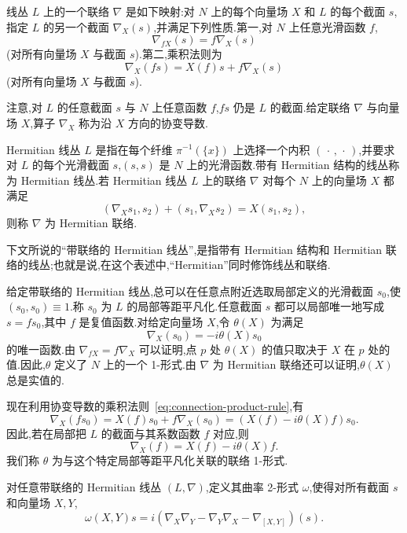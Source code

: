 \begin{definition}[线丛上的联络]
\label{def:connection-line-bundle}
线丛 $L$ 上的一个联络 $\nabla$ 是如下映射:对 $N$ 上的每个向量场 $X$ 和 $L$ 的每个截面 $s$,指定 $L$ 的另一个截面 $\nabla_X(s)$,并满足下列性质.第一,对 $N$ 上任意光滑函数 $f$,
\[
 \nabla_{fX}(s)=f\nabla_X(s)
 \label{eq:connection-linearity-vector-field}
\]
(对所有向量场 $X$ 与截面 $s$).第二,乘积法则为
\[
 \nabla_X(fs)=X(f)s+f\nabla_X(s)
 \label{eq:connection-product-rule}
\]
(对所有向量场 $X$ 与截面 $s$).

注意,对 $L$ 的任意截面 $s$ 与 $N$ 上任意函数 $f$,$fs$ 仍是 $L$ 的截面.给定联络 $\nabla$ 与向量场 $X$,算子 $\nabla_X$ 称为沿 $X$ 方向的协变导数.
\end{definition}

\begin{definition}[Hermitian 线丛]
\label{def:hermitian-line-bundle}
Hermitian 线丛 $L$ 是指在每个纤维 $\pi^{-1}(\{x\})$ 上选择一个内积 $(\,\cdot\,,\,\cdot\,)$,并要求对 $L$ 的每个光滑截面 $s$,$(s,s)$ 是 $N$ 上的光滑函数.带有 Hermitian 结构的线丛称为 Hermitian 线丛.若 Hermitian 线丛 $L$ 上的联络 $\nabla$ 对每个 $N$ 上的向量场 $X$ 都满足
\[
 (\nabla_Xs_1,s_2)+(s_1,\nabla_Xs_2)=X(s_1,s_2),
 \label{eq:hermitian-connection}
\]
则称 $\nabla$ 为 Hermitian 联络.
\end{definition}

下文所说的“带联络的 Hermitian 线丛”,是指带有 Hermitian 结构和 Hermitian 联络的线丛;也就是说,在这个表述中,“Hermitian”同时修饰线丛和联络.

给定带联络的 Hermitian 线丛,总可以在任意点附近选取局部定义的光滑截面 $s_0$,使 $(s_0,s_0)\equiv1$.称 $s_0$ 为 $L$ 的局部等距平凡化.任意截面 $s$ 都可以局部唯一地写成 $s=fs_0$,其中 $f$ 是复值函数.对给定向量场 $X$,令 $\theta(X)$ 为满足
\[
 \nabla_X(s_0)=-i\theta(X)s_0
\]
的唯一函数.由 $\nabla_{fX}=f\nabla_X$ 可以证明,点 $p$ 处 $\theta(X)$ 的值只取决于 $X$ 在 $p$ 处的值.因此,$\theta$ 定义了 $N$ 上的一个 1-形式.由 $\nabla$ 为 Hermitian 联络还可以证明,$\theta(X)$ 总是实值的.

现在利用协变导数的乘积法则~\eqref{eq:connection-product-rule},有
\[
 \nabla_X(fs_0)=X(f)s_0+f\nabla_X(s_0)
 =(X(f)-i\theta(X)f)s_0.
\]
因此,若在局部把 $L$ 的截面与其系数函数 $f$ 对应,则
\[
 \nabla_X(f)=X(f)-i\theta(X)f.
 \label{eq:local-covariant-derivative}
\]
我们称 $\theta$ 为与这个特定局部等距平凡化关联的联络 1-形式.

\begin{definition}[曲率 2-形式]
\label{def:curvature-two-form}
对任意带联络的 Hermitian 线丛 $(L,\nabla)$,定义其曲率 2-形式 $\omega$,使得对所有截面 $s$ 和向量场 $X,Y$,
\[
 \omega(X,Y)s
 =i\left(\nabla_X\nabla_Y-\nabla_Y\nabla_X-\nabla_{[X,Y]}\right)(s).
 \label{eq:curvature-definition}
\]
\end{definition}

